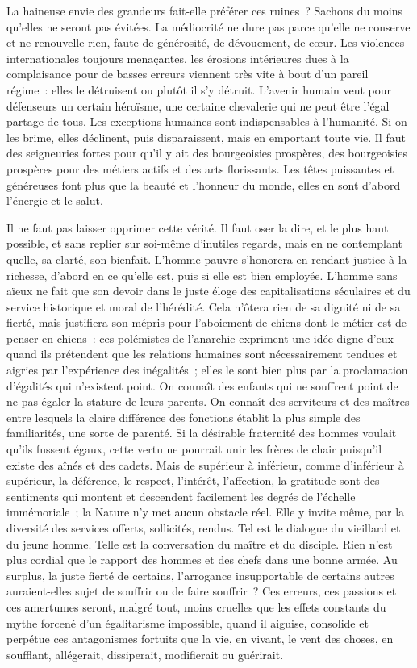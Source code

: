 \documentclass[french,twoside]{book} %
\begin{document}
La haineuse envie des grandeurs fait-elle préférer ces ruines ? Sachons du moins qu’elles ne seront pas évitées. La médiocrité ne dure pas parce qu’elle ne conserve et ne renouvelle rien, faute de générosité, de dévouement, de cœur. Les violences internationales toujours menaçantes, les érosions intérieures dues à la complaisance pour de basses erreurs viennent très vite à bout d’un pareil régime : elles le détruisent ou plutôt il s’y détruit. L’avenir humain veut pour défenseurs un certain héroïsme, une certaine chevalerie qui ne peut être l’égal partage de tous. Les exceptions humaines sont indispensables à l’humanité. Si on les brime, elles déclinent, puis disparaissent, mais en emportant toute vie. Il faut des seigneuries fortes pour qu’il y ait des bourgeoisies prospères, des bourgeoisies prospères pour des métiers actifs et des arts florissants. Les têtes puissantes et généreuses font plus que la beauté et l’honneur du monde, elles en sont d’abord l’énergie et le salut.\par
Il ne faut pas laisser opprimer cette vérité. Il faut oser la dire, et le plus haut possible, et sans replier sur soi-même d’inutiles regards, mais en ne contemplant quelle, sa clarté, son bienfait. L’homme pauvre s’honorera en rendant justice à la richesse, d’abord en ce qu’elle est, puis si elle est bien employée. L’homme sans aïeux ne fait que son devoir dans le juste éloge des capitalisations séculaires et du service historique et moral de l’hérédité. Cela n’ôtera rien de sa dignité ni de sa fierté, mais justifiera son mépris pour l’aboiement de chiens dont le métier est de penser en chiens : ces polémistes de l’anarchie expriment une idée digne d’eux quand ils prétendent que les relations humaines sont nécessairement tendues et aigries par l’expérience des inégalités ; elles le sont bien plus par la proclamation d’égalités qui n’existent point. On connaît des enfants qui ne souffrent point de ne pas égaler la stature de leurs parents. On connaît des serviteurs et des maîtres entre lesquels la claire différence des fonctions établit la plus simple des familiarités, une sorte de parenté. Si la désirable fraternité des hommes voulait qu’ils fussent égaux, cette vertu ne pourrait unir les frères de chair puisqu’il existe des aînés et des cadets. Mais de supérieur à inférieur, comme d’inférieur à supérieur, la déférence, le respect, l’intérêt, l’affection, la gratitude sont des sentiments qui montent et descendent facilement les degrés de l’échelle immémoriale ; la Nature n’y met aucun obstacle réel. Elle y invite même, par la diversité des services offerts, sollicités, rendus. Tel est le dialogue du vieillard et du jeune homme. Telle est la conversation du maître et du disciple. Rien n’est plus cordial que le rapport des hommes et des chefs dans une bonne armée. Au surplus, la juste fierté de certains, l’arrogance insupportable de certains autres auraient-elles sujet de souffrir ou de faire souffrir ? Ces erreurs, ces passions et ces amertumes seront, malgré tout, moins cruelles que les effets constants du mythe forcené d’un égalitarisme impossible, quand il aiguise, consolide et perpétue ces antagonismes fortuits que la vie, en vivant, le vent des choses, en soufflant, allégerait, dissiperait, modifierait ou guérirait.\par
\end{document}
